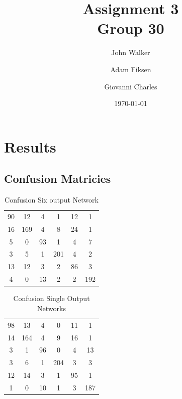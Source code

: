 \documentclass[11pt]{article}
\begin{document}
\title{Assignment 3 \\ Group 30  }

\author{John Walker \and Adam Fiksen \and Giovanni Charles }

\date{\today}         %

\maketitle           %


\section{Results}

\subsection{Confusion Matricies}

\begin{table}[H]
\caption{Confusion Six output Network} %
\centering %
\begin{tabular}{c c c c c c} %
\hline %
90  & 12   & 4   & 1     & 12  & 1   \\ %
16  & 169  & 4   & 8     & 24  & 1   \\
5   & 0    & 93  & 1     & 4   & 7   \\
3   & 5    & 1   & 201   & 4   & 2   \\
13  & 12   & 3   & 2     & 86  & 3   \\ 
4   & 0    & 13  & 2     & 2   & 192 \\ [1ex] %
\hline %
\end{tabular}
\label{table:sixconf} %
\end{table}

\begin{table}[H]
\caption{Confusion Single Output Networks} %
\centering %
\begin{tabular}{c c c c c c} %
\hline %
98  & 13   & 4   & 0    & 11  & 1   \\ %
14  & 164  & 4   & 9    & 16  & 1   \\
3   & 1    & 96  & 0    & 4   & 13  \\
3   & 6    & 1   & 204  & 3   & 3   \\
12  & 14   & 3   & 1    & 95  & 1   \\ 
1   & 0    & 10  & 1    & 3   & 187 \\ [1ex] %
\hline %
\end{tabular}
\label{table:singconf} %
\end{table}
\end{document}
